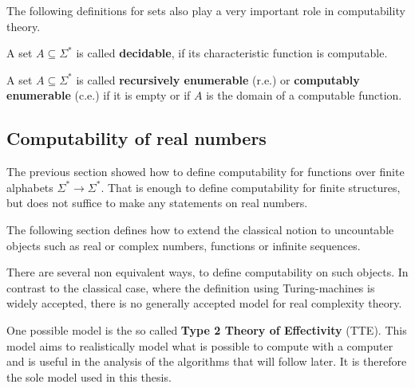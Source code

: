  The following definitions for sets also play a very important role in
 computability theory.
  \begin{definition}
A set $A \subseteq \Sigma^*$ is called \textbf{decidable}, if its characteristic function is computable.
\end{definition}
\begin{definition}
A set $A \subseteq \Sigma^*$ is called \textbf{recursively enumerable} (r.e.) or \textbf{computably enumerable} (c.e.) if
it is empty or if $A$ is the domain of a computable function.
\end{definition}
\subsection{Computability of real numbers}
The previous section showed how to define computability for functions over finite alphabets $\Sigma^* \to \Sigma^*$. 
That is enough to define computability for finite structures, but does not
suffice to make any statements on real numbers.

The following section defines how to extend the classical notion to uncountable
objects such as real or complex numbers, functions or infinite sequences.

There are several non equivalent ways, to define computability on such objects. 
In contrast to the classical case, where the definition using Turing-machines is widely accepted, there is no 
generally accepted model for real complexity theory.

One possible model is the so called \textbf{Type 2 Theory of Effectivity}
(TTE). \cite{Weihrauch} 
This model aims to realistically model what is possible to compute with a
computer and is useful in the analysis of the algorithms that will follow
later.
It is therefore the sole model used in this thesis. 

